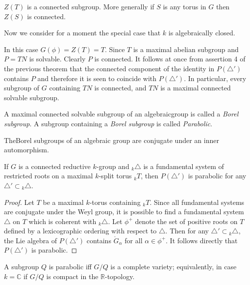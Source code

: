 \begin{remark*}
  $Z(T)$ is a connected subgroup. More generally if $S$ is any torus
  in $G$ then $Z(S)$ is connected.
\end{remark*}

Now we consider for a moment the special case that $k$ is
alge\-brai\-cally closed.

In this case $G(\phi)= Z(T)=T$. Since $T$ is a maximal abelian
subgroup and $P= TN$ is solvable. Clearly $P$ is connected. It follows
at once from assertion 4 of the previous theorem that the connected
component of the identity in $P (\triangle')$ contains $P$ and
therefore it is seen to coincide with $P (\triangle')$. In particular,
every subgroup of $G$ containing $TN$ is connected, and $TN$ is a
maximal connected solvable subgroup. 

\begin{defi*}
  A maximal connected solvable subgroup of an algebraic\break group is
  called a \textit{Borel subgroup}. A subgroup containing a
  \textit{Borel subgroup} is called \textit{Parabolic}.
\end{defi*}

\begin{thm}\label{chap0:thm0,14} %
  The\pageoriginale Borel subgroups of an algebraic group are conjugate under an
  inner automorphism.
\end{thm}

\begin{thm}\label{chap0:thm0.15} %
  If $G$ is a connected reductive $k$-group and ${}_k \triangle$ is a
  fundamental system of restricted roots on a maximal $k$-split torus
  ${}_k T$, then $P(\triangle')$ is parabolic for any $\triangle' \subset
  {}_k \triangle$. 
\end{thm}

\begin{proof}
  Let $T$ be a maximal $k$-torus containing ${}_k T$. Since all
  fundamental systems are conjugate under the Weyl group, it is
  possible to find a fundamental system $\triangle$ on $T$ which is
  coherent with ${}_k \triangle$. Let $\phi^+$ denote the set of positive
  roots on $T$ defined by a lexicographic ordering with respect to
  $\triangle$. Then for any $\triangle' \subset {}_k \triangle$, the Lie
  algebra of $P(\triangle')$ contains $\ring{G}_\alpha$ for all
  $\alpha \in \phi^+$. It follows directly that
  $P(\triangle')$ is parabolic. 
\end{proof}

\begin{remark*}
  A subgroup $Q$ is parabolic iff $G/Q$ is a complete variety;\break
  equivalently, in case $k= \mathbb{C}$ if $G/Q$ is compact in the
  $\mathbb{R}$-topology. 
\end{remark*}

